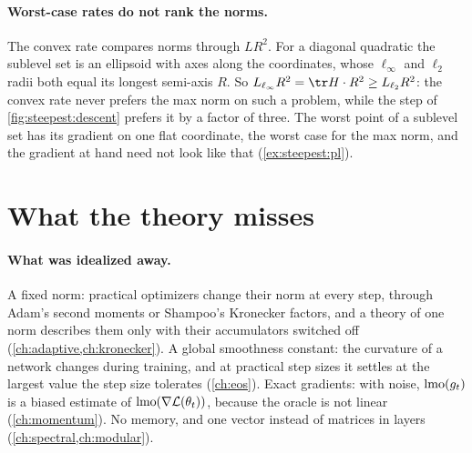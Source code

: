 \begin{refsection}
\paragraph{Worst-case rates do not rank the norms.} The convex rate compares norms through $LR^2$. For a diagonal quadratic the sublevel set is an ellipsoid with axes along the coordinates, whose $\ell_\infty$ and $\ell_2$ radii both equal its longest semi-axis $R$. So $L_{\ell_\infty}R^2=\tr H\cdot R^2\ge L_{\ell_2}R^2$: the convex rate never prefers the max norm on such a problem, while the step of \cref{fig:steepest:descent} prefers it by a factor of three. The worst point of a sublevel set has its gradient on one flat coordinate, the worst case for the max norm, and the gradient at hand need not look like that (\cref{ex:steepest:pl}).

\section{What the theory misses}\label{sec:steepest:misses}

\paragraph{What was idealized away.} A fixed norm: practical optimizers change their norm at every step, through Adam's second moments or Shampoo's Kronecker factors, and a theory of one norm describes them only with their accumulators switched off (\cref{ch:adaptive,ch:kronecker}). A global smoothness constant: the curvature of a network changes during training, and at practical step sizes it settles at the largest value the step size tolerates (\cref{ch:eos}). Exact gradients: with noise, $\operatorname{lmo}(g_t)$ is a biased estimate of $\operatorname{lmo}(\nabla\mathcal{L}(\theta_t))$, because the oracle is not linear (\cref{ch:momentum}). No memory, and one vector instead of matrices in layers (\cref{ch:spectral,ch:modular}).


\end{refsection}
